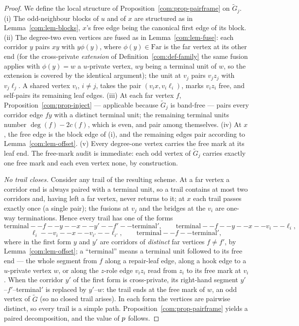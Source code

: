 \begin{proof}
We define the local structure of Proposition~\ref{com:prop-pairframe} on
$\tilde G_j$.
(i) The odd-neighbour blocks of $u$ and of $x$ are structured as in
Lemma~\ref{com:lem-blocks}, $x$'s free edge being the canonical first
edge of its block.
(ii) The degree-two even vertices are fused as in Lemma~\ref{com:lem-fuse}:
each corridor $y$ pairs $xy$ with $y\phi(y)$, where
$\phi(y)\in\mathrm{Far}$ is the far vertex at its other end (for the
cross-private \emph{extension} of Definition~\ref{com:def-family} the
same fusion applies with $\phi(y)=w$ a $u$-private vertex, $wy$ being a
terminal unit of $w$, so the extension is covered by the identical
argument); the unit at $v_j$ pairs $v_jz_j$ with $v_j\ell_j$. A shared
vertex $v_i$, $i\ne j$, takes the pair $(v_ix,v_i\ell_i)$, marks $v_iz_i$
free, and self-pairs its remaining leaf edges.
(iii) At each far vertex $f$, Proposition~\ref{com:prop-inject} ---
applicable because $\tilde G_j$ is band-free --- pairs every corridor
edge $fy$ with a distinct terminal unit; the remaining terminal units
number $\deg(f)-2c(f)$, which is even, and pair among themselves.
(iv) At $x$, the free edge is the block edge of (i), and the remaining
edges pair according to Lemma~\ref{com:lem-offset}.
(v) Every degree-one vertex carries the free mark at its leaf end. The
free-mark audit is immediate: each odd vertex of $\tilde G_j$ carries
exactly one free mark and each even vertex none, by construction.

\emph{No trail closes.} Consider any trail of the resulting scheme. At a
far vertex a corridor end is always paired with a terminal unit, so a
trail contains at most two corridors and, having left a far vertex, never
returns to it; at $x$ each trail passes exactly once (a single pair); the
fusions at $v_j$ and the bridges at the $v_i$ are one-way terminations.
Hence every trail has one of the forms
\[
\text{terminal}--f--y--x--y'--f'--\text{terminal}',\qquad
\text{terminal}--f--y--x--v_i--\ell_i,
\]
\[
\ell_i--v_i--x--v_{i'}--\ell_{i'},\qquad
\text{terminal}--f--\text{terminal}',
\]
where in the first form $y$ and $y'$ are corridors of \emph{distinct} far
vertices $f\ne f'$, by Lemma~\ref{com:lem-offset}; a ``terminal'' means a
terminal unit followed to its free end --- the whole segment from $f$
along a repair-leaf edge, along a hook edge to a $u$-private vertex $w$,
or along the $z$-role edge $v_iz_i$ read from $z_i$ to its free mark at
$v_i$. When the corridor $y'$ of the first form is cross-private, its
right-hand segment $y'$--$f'$--terminal$'$ is replaced by $y'$--$w$: the
trail ends at the free mark of $w$, an odd vertex of $\tilde G$ (so no
closed trail arises). In each form the vertices are pairwise distinct, so
every trail is a simple path. Proposition~\ref{com:prop-pairframe} yields
a paired decomposition, and the value of $p$ follows.
\end{proof}

